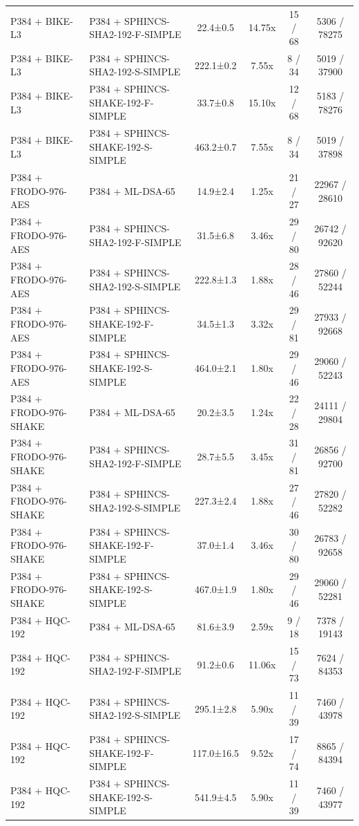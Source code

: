 \documentclass[10pt]{article}
\begin{document}
\begin{tabular}{@{}l l c c c c@{}}
P384 + BIKE-L3 & P384 + SPHINCS-SHA2-192-F-SIMPLE & 22.4±0.5 & 14.75x & 15 / 68 & 5306 / 78275 \\
P384 + BIKE-L3 & P384 + SPHINCS-SHA2-192-S-SIMPLE & 222.1±0.2 & 7.55x & 8 / 34 & 5019 / 37900 \\
P384 + BIKE-L3 & P384 + SPHINCS-SHAKE-192-F-SIMPLE & 33.7±0.8 & 15.10x & 12 / 68 & 5183 / 78276 \\
P384 + BIKE-L3 & P384 + SPHINCS-SHAKE-192-S-SIMPLE & 463.2±0.7 & 7.55x & 8 / 34 & 5019 / 37898 \\
P384 + FRODO-976-AES & P384 + ML-DSA-65 & 14.9±2.4 & 1.25x & 21 / 27 & 22967 / 28610 \\
P384 + FRODO-976-AES & P384 + SPHINCS-SHA2-192-F-SIMPLE & 31.5±6.8 & 3.46x & 29 / 80 & 26742 / 92620 \\
P384 + FRODO-976-AES & P384 + SPHINCS-SHA2-192-S-SIMPLE & 222.8±1.3 & 1.88x & 28 / 46 & 27860 / 52244 \\
P384 + FRODO-976-AES & P384 + SPHINCS-SHAKE-192-F-SIMPLE & 34.5±1.3 & 3.32x & 29 / 81 & 27933 / 92668 \\
P384 + FRODO-976-AES & P384 + SPHINCS-SHAKE-192-S-SIMPLE & 464.0±2.1 & 1.80x & 29 / 46 & 29060 / 52243 \\
P384 + FRODO-976-SHAKE & P384 + ML-DSA-65 & 20.2±3.5 & 1.24x & 22 / 28 & 24111 / 29804 \\
P384 + FRODO-976-SHAKE & P384 + SPHINCS-SHA2-192-F-SIMPLE & 28.7±5.5 & 3.45x & 31 / 81 & 26856 / 92700 \\
P384 + FRODO-976-SHAKE & P384 + SPHINCS-SHA2-192-S-SIMPLE & 227.3±2.4 & 1.88x & 27 / 46 & 27820 / 52282 \\
P384 + FRODO-976-SHAKE & P384 + SPHINCS-SHAKE-192-F-SIMPLE & 37.0±1.4 & 3.46x & 30 / 80 & 26783 / 92658 \\
P384 + FRODO-976-SHAKE & P384 + SPHINCS-SHAKE-192-S-SIMPLE & 467.0±1.9 & 1.80x & 29 / 46 & 29060 / 52281 \\
P384 + HQC-192 & P384 + ML-DSA-65 & 81.6±3.9 & 2.59x & 9 / 18 & 7378 / 19143 \\
P384 + HQC-192 & P384 + SPHINCS-SHA2-192-F-SIMPLE & 91.2±0.6 & 11.06x & 15 / 73 & 7624 / 84353 \\
P384 + HQC-192 & P384 + SPHINCS-SHA2-192-S-SIMPLE & 295.1±2.8 & 5.90x & 11 / 39 & 7460 / 43978 \\
P384 + HQC-192 & P384 + SPHINCS-SHAKE-192-F-SIMPLE & 117.0±16.5 & 9.52x & 17 / 74 & 8865 / 84394 \\
P384 + HQC-192 & P384 + SPHINCS-SHAKE-192-S-SIMPLE & 541.9±4.5 & 5.90x & 11 / 39 & 7460 / 43977 \\

\end{tabular}
\end{document}
